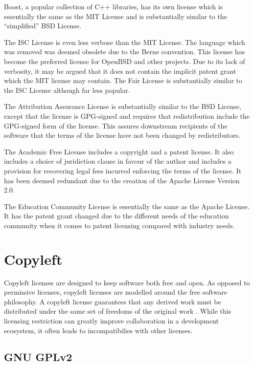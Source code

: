 \documentclass[12pt,letterpaper]{article}
\begin{document}
Boost, a popular collection of C++ libraries, has its own license which is essentially the same as the MIT License and is substantially similar to the ``simplified'' BSD License.

The ISC License is even less verbose than the MIT License. The language which was removed was deemed obsolete due to the Berne convention. This license has become the preferred license for OpenBSD and other projects. Due to its lack of verbosity, it may be argued that it does not contain the implicit patent grant which the MIT license may contain. The Fair License is substantially similar to the ISC License although far less popular.

The Attribution Assurance License is substantially similar to the BSD License, except that the license is GPG-signed and requires that redistribution include the GPG-signed form of the license. This assures downstream recipients of the software that the terms of the license have not been changed by redistributors.

The Academic Free License includes a copyright and a patent license. It also includes a choice of juridiction clause in favour of the author and includes a provision for recovering legal fees incurred enforcing the terms of the license. It has been deemed redundant due to the creation of the Apache License Version 2.0.

The Education Community License is essentially the same as the Apache License. It has the patent grant changed due to the different needs of the education community when it comes to patent licensing compared with industry needs.

\newpage
\section{Copyleft}

Copyleft licenses are designed to keep software both free and open. As opposed to permissive licenses, copyleft licenses are modelled around the free software philosophy. A copyleft license guarantees that any derived work must be distributed under the same set of freedoms of the original work \cite{copyleft}. While this licensing restriction can greatly improve collaboration in a development ecosystem, it often leads to incompatibilies with other licenses.

\subsection{GNU GPLv2}
\end{document}
